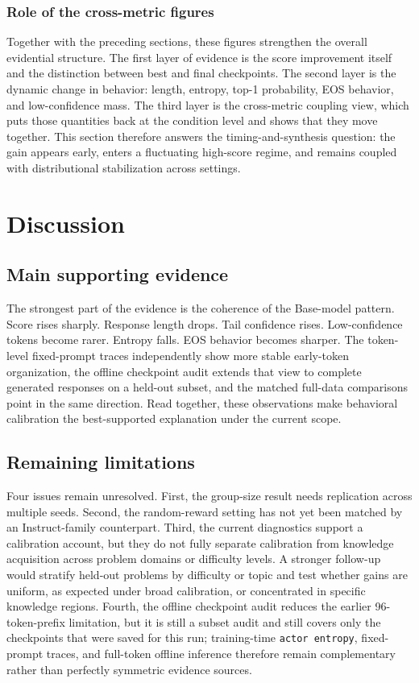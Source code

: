 \documentclass[12pt,a4paper]{ctexart}
\begin{document}
\subsubsection{Role of the cross-metric figures}

Together with the preceding sections, these figures strengthen the overall evidential structure. The first layer of evidence is the score improvement itself and the distinction between best and final checkpoints. The second layer is the dynamic change in behavior: length, entropy, top-1 probability, EOS behavior, and low-confidence mass. The third layer is the cross-metric coupling view, which puts those quantities back at the condition level and shows that they move together. This section therefore answers the timing-and-synthesis question: the gain appears early, enters a fluctuating high-score regime, and remains coupled with distributional stabilization across settings.

\section{Discussion}

\subsection{Main supporting evidence}

The strongest part of the evidence is the coherence of the Base-model pattern. Score rises sharply. Response length drops. Tail confidence rises. Low-confidence tokens become rarer. Entropy falls. EOS behavior becomes sharper. The token-level fixed-prompt traces independently show more stable early-token organization, the offline checkpoint audit extends that view to complete generated responses on a held-out subset, and the matched full-data comparisons point in the same direction. Read together, these observations make behavioral calibration the best-supported explanation under the current scope.

\subsection{Remaining limitations}

Four issues remain unresolved. First, the group-size result needs replication across multiple seeds. Second, the random-reward setting has not yet been matched by an Instruct-family counterpart. Third, the current diagnostics support a calibration account, but they do not fully separate calibration from knowledge acquisition across problem domains or difficulty levels. A stronger follow-up would stratify held-out problems by difficulty or topic and test whether gains are uniform, as expected under broad calibration, or concentrated in specific knowledge regions. Fourth, the offline checkpoint audit reduces the earlier 96-token-prefix limitation, but it is still a subset audit and still covers only the checkpoints that were saved for this run; training-time \texttt{actor entropy}, fixed-prompt traces, and full-token offline inference therefore remain complementary rather than perfectly symmetric evidence sources.
\end{document}
